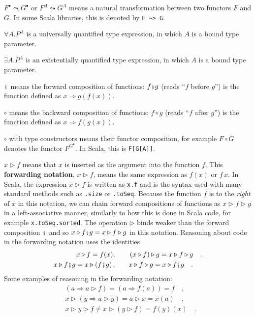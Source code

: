 $F^{\bullet}\leadsto G^{\bullet}$ or $F^{A}\leadsto G^{A}$ means
a natural transformation between two functors $F$ and $G$. In some
Scala libraries, this is denoted by \lstinline!F ~> G!.

$\forall A.P^{A}$ is a universally quantified type expression, in
which $A$ is a bound type parameter.

$\exists A.P^{A}$ is an existentially quantified type expression,
in which $A$ is a bound type parameter.

$\bef$ means the forward composition
of functions: $f\bef g$ (reads ``$f$ before $g$'') is the function
defined as $x\Rightarrow g(f(x))$.

$\circ$ means the backward composition
of functions: $f\circ g$ (reads ``$f$ after $g$'') is the function
defined as $x\Rightarrow f(g(x))$.

$\circ$ with type constructors means their functor composition, for
example $F\circ G$ denotes the functor $F^{G^{\bullet}}$. In Scala,
this is \lstinline!F[G[A]]!. 

$x\triangleright f$ means that $x$ is inserted as the argument into
the function $f$. This \textbf{forwarding notation},
$x\triangleright f$, means the same expression as $f(x)$ or $f\,x$.
In Scala, the expression $x\triangleright f$ is written as \lstinline!x.f!
and is the syntax used with many standard methods such as \lstinline!.size!
or \lstinline!.toSeq!.
Because the function $f$ is to the \emph{right} of $x$ in this notation,
we can chain forward compositions of functions as $x\triangleright f\triangleright g$
in a left-associative manner, similarly to how this is done in Scala
code, for example \lstinline!x.toSeq.sorted!.
The operation $\triangleright$ binds weaker than the forward composition
$\bef$ and so $x\triangleright f\bef g=x\triangleright f\triangleright g$
in this notation. Reasoning about code in the forwarding notation
uses the identities
\begin{align*}
x\triangleright f=f(x),\quad\quad & \left(x\triangleright f\right)\triangleright g=x\triangleright f\triangleright g\quad,\\
x\triangleright f\bef g=x\triangleright\left(f\bef g\right),\quad\quad & x\triangleright f\triangleright g=x\triangleright f\bef g\quad.
\end{align*}
Some examples of reasoning in the forwarding notation:
\begin{align*}
 & \left(a\Rightarrow a\triangleright f\right)=\left(a\Rightarrow f(a)\right)=f\quad,\\
 & x\triangleright\left(y\Rightarrow a\triangleright y\right)=a\triangleright x=x(a)\quad,\\
 & x\triangleright y\triangleright f\neq x\triangleright\left(y\triangleright f\right)=f(y)(x)\quad.
\end{align*}

